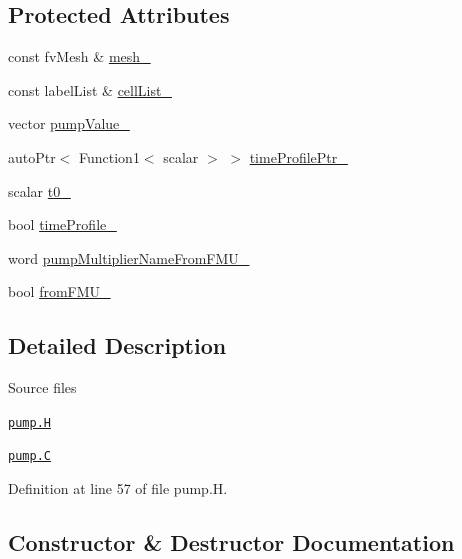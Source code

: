\subsection*{Protected Attributes}
\begin{DoxyCompactItemize}
\item 
const fv\+Mesh \& \hyperlink{classFoam_1_1pump_a23edeeeecebcef11921a33dd5d990570}{mesh\+\_\+}
\item 
const label\+List \& \hyperlink{classFoam_1_1pump_a862023384435c85bb1de8c92146e0fff}{cell\+List\+\_\+}
\item 
vector \hyperlink{classFoam_1_1pump_a23ed53ce07d7547cd4027d42c31b4bac}{pump\+Value\+\_\+}
\item 
auto\+Ptr$<$ Function1$<$ scalar $>$ $>$ \hyperlink{classFoam_1_1pump_ab173433fe3a9a7110c945853a328cc7c}{time\+Profile\+Ptr\+\_\+}
\item 
scalar \hyperlink{classFoam_1_1pump_a3816eaa23a3b93f40d8710360534d0a2}{t0\+\_\+}
\item 
bool \hyperlink{classFoam_1_1pump_a1916605373dd2d5dd8958f67026721bd}{time\+Profile\+\_\+}
\item 
word \hyperlink{classFoam_1_1pump_a0038c356a4b31e6d0b224a3cac274211}{pump\+Multiplier\+Name\+From\+F\+M\+U\+\_\+}
\item 
bool \hyperlink{classFoam_1_1pump_ab9bab6689728aa9097d385b0668c84d9}{from\+F\+M\+U\+\_\+}
\end{DoxyCompactItemize}


\subsection{Detailed Description}
\begin{DoxyParagraph}{Source files}

\begin{DoxyItemize}
\item \href{../../../home/carlo/data/GeN-Foam/GeN-Foam_ffn/GeN-Foam/GeN-Foam/classes/thermalHydraulics/src/phaseModels/structureModels/pump/pump.H}{\tt pump.\+H} 
\item \href{../../../home/carlo/data/GeN-Foam/GeN-Foam_ffn/GeN-Foam/GeN-Foam/classes/thermalHydraulics/src/phaseModels/structureModels/pump/pump.C}{\tt pump.\+C} 
\end{DoxyItemize}
\end{DoxyParagraph}


Definition at line 57 of file pump.\+H.



\subsection{Constructor \& Destructor Documentation}
\mbox{\label{classFoam_1_1pump_af67ccd51d25879110bde7044b3a97c28}} 
